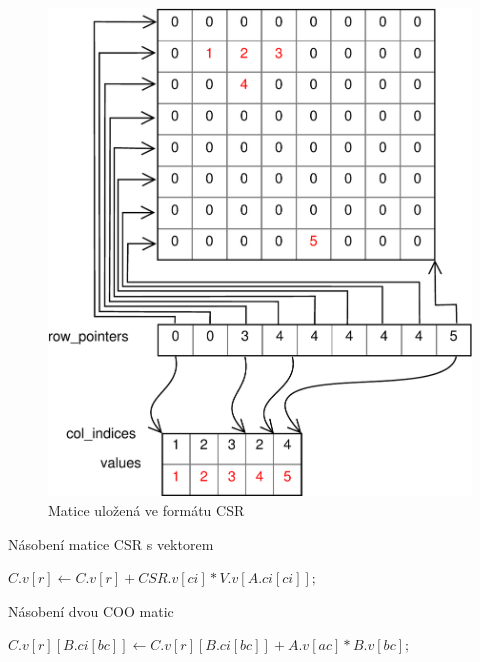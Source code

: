 \begin{figure}[H]\centering
	\includegraphics[width=\textwidth]{./images/csr/csr}
	\caption{Matice uložená ve formátu CSR}
	\label{fig:CSR}
\end{figure}


\begin{algorithm}[H]
	\caption{Násobení matice CSR s vektorem}\label{csr-mvm}
	\begin{algorithmic}[1]
				\State \texttt{$C.v[r] \gets C.v[r] + CSR.v[ci] * V.v[A.ci[ci]];$}
			\EndFor
		\EndFor
		\EndProcedure
	\end{algorithmic}
\end{algorithm}

\begin{algorithm}[H]
	\caption{Násobení dvou COO matic}\label{csr-mmm}
	\begin{algorithmic}[1]
					\State \texttt{$C.v[r][B.ci[bc]] \gets C.v[r][B.ci[bc]] + A.v[ac] * B.v[bc];$}
				\EndFor
			\EndFor
		\EndFor
		\EndProcedure
	\end{algorithmic}
\end{algorithm}


